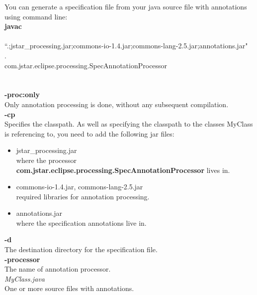 \documentclass{article}
\begin{document}
You can generate a specification file from your java source file with annotations using command line:\\
{\bf javac}\\
\hspace*{20 pt}{\bf-proc:only} \\
\hspace*{20 pt}{\bf -cp} ``.;jstar\_processing.jar;commons-io-1.4.jar;commons-lang-2.5.jar;annotations.jar" \\
\hspace*{20 pt}{\bf -d} . \\
\hspace*{20 pt}{\bf -processor} com.jstar.eclipse.processing.SpecAnnotationProcessor \\
\hspace*{20 pt}{\it MyClass.java}\\\\
{\bf -proc:only }\\
\hspace*{20pt} Only annotation processing is done, without any subsequent compilation.\\
{\bf -cp}\\
\hspace*{20pt} Specifies the classpath. As well as specifying the classpath to the classes MyClass is referencing to, you need to add the following jar files:
\begin{itemize}
\item jstar\_processing.jar \\ where the processor {\bf com.jstar.eclipse.processing.SpecAnnotationProcessor} lives in.
\item commons-io-1.4.jar, commons-lang-2.5.jar \\ required libraries for annotation processing.
\item annotations.jar \\ where the specification annotations live in.
\end{itemize}
{\bf -d} \\ 
\hspace*{20 pt}The destination directory for the specification file.\\
{\bf -processor}\\
\hspace*{20 pt}The name of annotation processor. \\
{\it MyClass.java}\\
\hspace*{20 pt} One or more source files with annotations.
\end{document}
